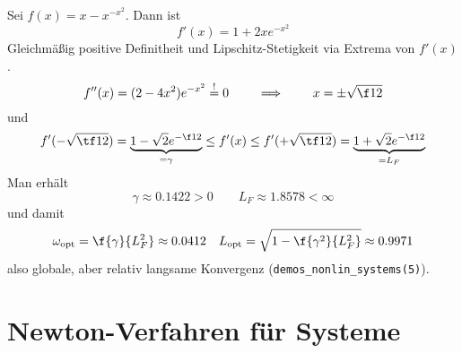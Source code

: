 \documentclass[11pt]{scrbook}
\begin{document}
\begin{st}
\begin{note}
\begin{itemize}
		\end{itemize}
	\end{note}
\end{st}

\begin{ex*}
	Sei $f(x) = x - x^{-x^2}$.
	Dann ist
	\[
		f'(x) = 1 + 2xe^{-x^2}
	\]
	Gleichmäßig positive Definitheit und Lipschitz-Stetigkeit via Extrema von $f'(x)$.	
	\[
		f''(x) = (2-4x^2)e^{-x^2} \stackrel != 0
		\qquad \implies \qquad
		x = \pm \sqrt{\f 12}
	\]
	und
	\begin{align*}
		f'(-\sqrt{\tf 12}) = \underbrace{1 - \sqrt 2 e^{-\f 12}}_{= \gamma} \le f'(x) \le f'(+\sqrt{\tf 12}) = \underbrace{1 + \sqrt 2 e^{- \f 12}}_{= L_F}
	\end{align*}
	Man erhält
	\[
		\gamma \approx 0.1422 > 0
		\qquad
		L_F \approx 1.8578 < \infty
	\]
	und damit
	\begin{align*}
		\omega_{\text{opt}} &= \f{\gamma}{L_F^2} \approx 0.0412 &
		L_{\text{opt}} = \sqrt{1- \f{\gamma^2}{L_F^2}} \approx 0.9971
	\end{align*}
	also globale, aber relativ langsame Konvergenz (\verb|demos_nonlin_systems(5)|).
\end{ex*}


\section{Newton-Verfahren für Systeme}
\end{document}
